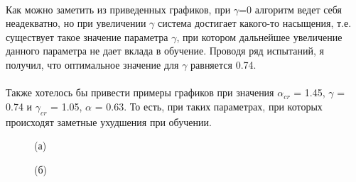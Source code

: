 \documentclass[a4paper]{report}
\theoremstyle{definition}
\theoremstyle{plain}
\theoremstyle{remark}
\theoremstyle{remark}
\theoremstyle{definition}
\begin{document}
\\
Как можно заметить из приведенных графиков, при $\gamma$=0 алгоритм ведет себя неадекватно, но при увеличении $\gamma$ система достигает какого-то насыщения, т.е. существует такое значение параметра $\gamma$, при котором дальнейшее увеличение данного параметра не дает вклада в обучение. Проводя ряд испытаний, я получил, что оптимальное значение для $\gamma$ равняется 0.74.
\\
\\
Также хотелось бы привести примеры графиков при значения $\alpha_{cr}$ = 1.45, $\gamma$ = 0.74 и $\gamma_{cr}$ = 1.05, $\alpha$ = 0.63. То есть, при таких параметрах, при которых происходят заметные ухудшения при обучении.
\begin{figure}[H]
    \begin{minipage}[H]{0.49\linewidth}
        (а)\\
    \end{minipage}
    \hfill
    \begin{minipage}[H]{0.49\linewidth}
        (б)\\

\end{minipage}
\end{figure}
\end{document}
